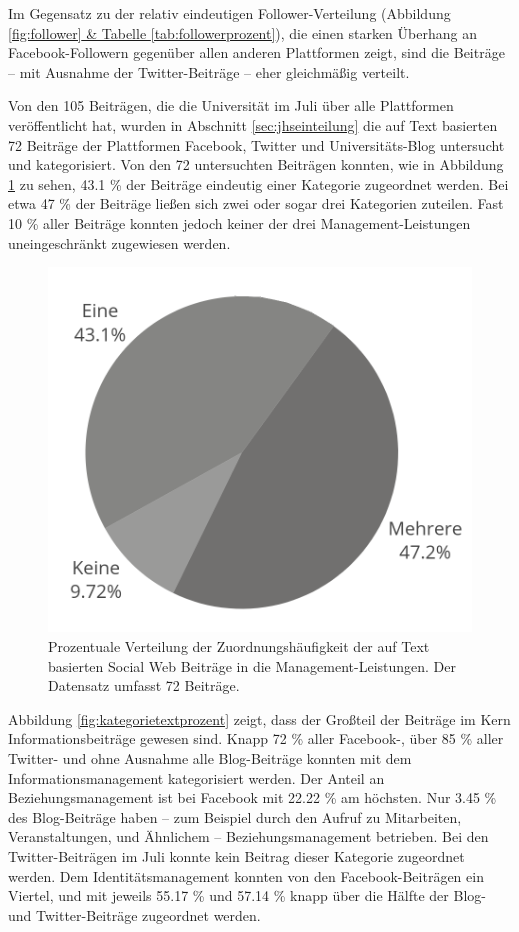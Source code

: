 Im Gegensatz zu der relativ eindeutigen Follower-Verteilung (Abbildung \hyperref[fig:follower]{\ref{fig:follower} \& Tabelle \ref{tab:followerprozent}}), die einen starken Überhang an Facebook-Followern gegenüber allen anderen Plattformen zeigt, sind die Beiträge -- mit Ausnahme der Twitter-Beiträge -- eher gleichmäßig verteilt.

Von den 105 Beiträgen, die die Universität im Juli über alle Plattformen veröffentlicht hat, wurden in Abschnitt \ref{sec:jhseinteilung} die auf Text basierten 72 Beiträge der Plattformen Facebook, Twitter und Universitäts-Blog untersucht und kategorisiert. Von den 72 untersuchten Beiträgen konnten, wie in Abbildung \ref{fig:kategorietext} zu sehen, 43.1 \% der Beiträge eindeutig einer Kategorie zugeordnet werden. Bei etwa 47 \% der Beiträge ließen sich zwei oder sogar drei Kategorien zuteilen. Fast 10 \% aller Beiträge konnten jedoch keiner der drei Management-Leistungen uneingeschränkt zugewiesen werden.

\begin{figure}[H]
    \centering
    \includegraphics[width=.5\textwidth]{img/plots/kat/kat_text.png}
    \caption{Prozentuale Verteilung der Zuordnungshäufigkeit der auf Text basierten Social Web Beiträge in die Management-Leistungen. Der Datensatz umfasst 72 Beiträge.}
    \label{fig:kategorietext}
\end{figure}  

Abbildung \ref{fig:kategorietextprozent} zeigt, dass der Großteil der Beiträge im Kern Informationsbeiträge gewesen sind. Knapp 72 \% aller Facebook-, über 85 \% aller Twitter- und ohne Ausnahme alle Blog-Beiträge konnten mit dem Informationsmanagement kategorisiert werden. Der Anteil an Beziehungsmanagement ist bei Facebook mit 22.22 \% am höchsten. Nur 3.45 \% des Blog-Beiträge haben -- zum Beispiel durch den Aufruf zu Mitarbeiten, Veranstaltungen, und Ähnlichem -- Beziehungsmanagement betrieben. Bei den Twitter-Beiträgen im Juli konnte kein Beitrag dieser Kategorie zugeordnet werden. Dem Identitätsmanagement konnten von den Facebook-Beiträgen ein Viertel, und mit jeweils 55.17 \% und 57.14 \% knapp über die Hälfte der Blog- und Twitter-Beiträge zugeordnet werden.

